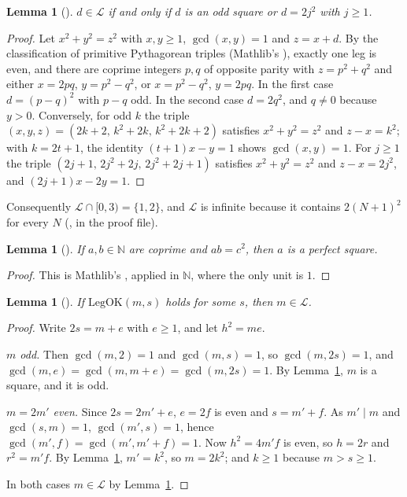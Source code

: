 \documentclass[11pt]{amsart}
\theoremstyle{plain}
\newtheorem{lemma}[theorem]{Lemma}
\theoremstyle{definition}
\newcommand{\N}{\mathbb{N}}
\newcommand{\Leg}{\mathcal{L}}
\newcommand{\LegOK}{\mathrm{LegOK}}
\begin{document}
\begin{lemma}[]\label{lem:L}
$d\in\Leg$ if and only if $d$ is an odd square or $d=2j^2$ with $j\ge1$.
\end{lemma}

\begin{proof}
Let $x^2+y^2=z^2$ with $x,y\ge1$, $\gcd(x,y)=1$ and $z=x+d$. By the classification of primitive Pythagorean triples (Mathlib's ), exactly one leg is even, and there are coprime integers $p,q$ of opposite parity with $z=p^2+q^2$ and either $x=2pq$, $y=p^2-q^2$, or $x=p^2-q^2$, $y=2pq$. In the first case $d=(p-q)^2$ with $p-q$ odd. In the second case $d=2q^2$, and $q\ne0$ because $y>0$. Conversely, for odd $k$ the triple $(x,y,z)=(2k+2,\,k^2+2k,\,k^2+2k+2)$ satisfies $x^2+y^2=z^2$ and $z-x=k^2$; with $k=2t+1$, the identity $(t+1)x-y=1$ shows $\gcd(x,y)=1$. For $j\ge1$ the triple $(2j+1,\,2j^2+2j,\,2j^2+2j+1)$ satisfies $x^2+y^2=z^2$ and $z-x=2j^2$, and $(2j+1)x-2y=1$.
\end{proof}

Consequently $\Leg\cap[0,3)=\{1,2\}$, and $\Leg$ is infinite because it contains $2(N+1)^2$ for every $N$ (, in the proof file).

\begin{lemma}[]\label{lem:coprime}
If $a,b\in\N$ are coprime and $ab=c^2$, then $a$ is a perfect square.
\end{lemma}

\begin{proof}
This is Mathlib's , applied in $\N$, where the only unit is $1$.
\end{proof}

\begin{lemma}[]\label{lem:nec}
If $\LegOK(m,s)$ holds for some $s$, then $m\in\Leg$.
\end{lemma}

\begin{proof}
Write $2s=m+e$ with $e\ge1$, and let $h^2=me$.

\emph{$m$ odd.} Then $\gcd(m,2)=1$ and $\gcd(m,s)=1$, so $\gcd(m,2s)=1$, and $\gcd(m,e)=\gcd(m,m+e)=\gcd(m,2s)=1$. By Lemma~\ref{lem:coprime}, $m$ is a square, and it is odd.

\emph{$m=2m'$ even.} Since $2s=2m'+e$, $e=2f$ is even and $s=m'+f$. As $m'\mid m$ and $\gcd(s,m)=1$, $\gcd(m',s)=1$, hence $\gcd(m',f)=\gcd(m',m'+f)=1$. Now $h^2=4m'f$ is even, so $h=2r$ and $r^2=m'f$. By Lemma~\ref{lem:coprime}, $m'=k^2$, so $m=2k^2$; and $k\ge1$ because $m>s\ge1$.

In both cases $m\in\Leg$ by Lemma~\ref{lem:L}.
\end{proof}
\end{document}
